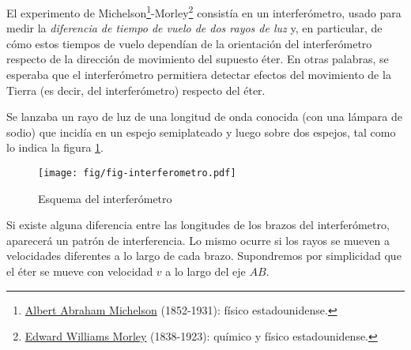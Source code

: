 El experimento de Michelson\footnote{\href{http://es.wikipedia.org/wiki/Albert_Abraham_Michelson}{Albert Abraham Michelson} (1852-1931): físico estadounidense.}-Morley\footnote{\href{http://es.wikipedia.org/wiki/Edward_Morley}{Edward Williams Morley} (1838-1923): químico y físico estadounidense.} \cite{MM87} consistía en un interferómetro, usado para medir la \textit{diferencia de tiempo de vuelo de dos rayos de luz} y, en particular, de cómo estos tiempos de vuelo dependían de la orientación del interferómetro respecto de la dirección de movimiento del supuesto éter. En otras palabras, se esperaba que el interferómetro permitiera detectar efectos del movimiento de la Tierra (es decir, del interferómetro) respecto del éter.

Se lanzaba un rayo de luz de una longitud de onda conocida (con una lámpara de sodio) que incidía en un espejo semiplateado y luego sobre dos espejos, tal como lo indica la figura \ref{fig:michelson}.
\begin{figure}[ht]
\begin{center}
\texttt{[image: fig/fig-interferometro.pdf]}
\end{center}
\caption{Esquema del interferómetro} \label{fig:michelson}
\end{figure}

Si existe alguna diferencia entre las longitudes de los brazos del interferómetro, aparecerá un patrón de interferencia. Lo mismo ocurre si los rayos se mueven a velocidades diferentes a lo largo de cada brazo. Supondremos por simplicidad que el éter se mueve con velocidad $v$ a lo largo del eje $AB$.

